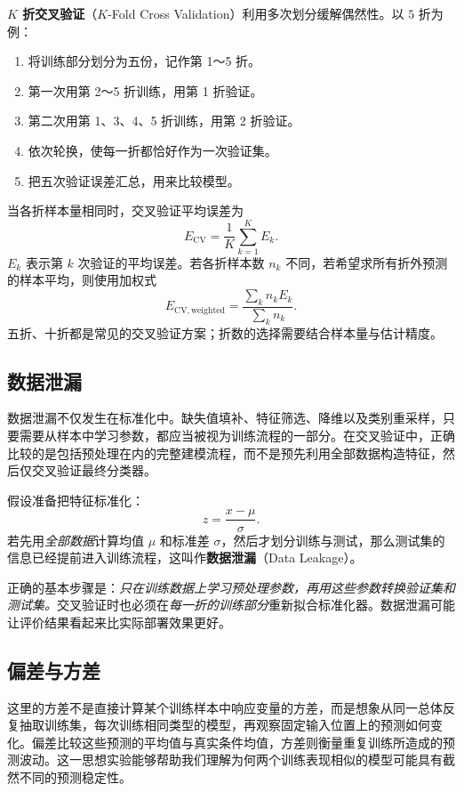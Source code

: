 \textbf{$K$ 折交叉验证}（$K$-Fold Cross Validation）利用多次划分缓解偶然性。以 $5$ 折为例：
\begin{enumerate}
\item 将训练部分划分为五份，记作第 1～5 折。
\item 第一次用第 2～5 折训练，用第 1 折验证。
\item 第二次用第 1、3、4、5 折训练，用第 2 折验证。
\item 依次轮换，使每一折都恰好作为一次验证集。
\item 把五次验证误差汇总，用来比较模型。
\end{enumerate}
当各折样本量相同时，交叉验证平均误差为
\begin{equation}\label{eq:kfold}
\boxed{E_{\mathrm{CV}}=\frac1K\sum_{k=1}^{K}E_k.}
\end{equation}
$E_k$ 表示第 $k$ 次验证的平均误差。若各折样本数 $n_k$ 不同，若希望求所有折外预测的样本平均，则使用加权式
\begin{equation}\label{eq:kfold-weighted}
E_{\mathrm{CV,weighted}}=\frac{\sum_k n_kE_k}{\sum_k n_k}.
\end{equation}
五折、十折都是常见的交叉验证方案；折数的选择需要结合样本量与估计精度。

\subsection{数据泄漏}

数据泄漏不仅发生在标准化中。缺失值填补、特征筛选、降维以及类别重采样，只要需要从样本中学习参数，都应当被视为训练流程的一部分。在交叉验证中，正确比较的是包括预处理在内的完整建模流程，而不是预先利用全部数据构造特征，然后仅交叉验证最终分类器。

假设准备把特征标准化：
\[
z=\frac{x-\mu}{\sigma}.
\]
若先用\emph{全部数据}计算均值 $\mu$ 和标准差 $\sigma$，然后才划分训练与测试，那么测试集的信息已经提前进入训练流程，这叫作\textbf{数据泄漏}（Data Leakage）。

正确的基本步骤是：\emph{只在训练数据上学习预处理参数，再用这些参数转换验证集和测试集。}交叉验证时也必须在\emph{每一折的训练部分}重新拟合标准化器。数据泄漏可能让评价结果看起来比实际部署效果更好。

\subsection{偏差与方差}

这里的方差不是直接计算某个训练样本中响应变量的方差，而是想象从同一总体反复抽取训练集，每次训练相同类型的模型，再观察固定输入位置上的预测如何变化。偏差比较这些预测的平均值与真实条件均值，方差则衡量重复训练所造成的预测波动。这一思想实验能够帮助我们理解为何两个训练表现相似的模型可能具有截然不同的预测稳定性。

